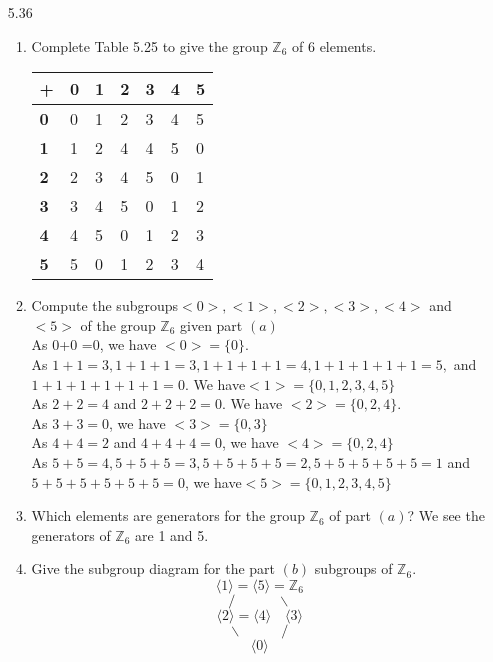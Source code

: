 \documentclass[12pt]{article}
\newcommand{\Z}{\mathds{Z}}
\begin{document}
\begin{enumerate}
		\item[5.36] \begin{enumerate}
			\item Complete Table 5.25 to give the group $\Z_6$ of 6 elements.
			\begin{table}[!h]
				\begin{tabular}{|l|l|l|l|l|l|l|}
					\hline
					+ & \textbf{0} & \textbf{1} & \textbf{2} & \textbf{3} & \textbf{4} & \textbf{5} \\ \hline
					\textbf{0} & 0 & 1 & 2 & 3 & 4 & 5 \\ \hline
					\textbf{1} & 1 & 2 & 4 & 4 & 5 & 0 \\ \hline
					\textbf{2} & 2 & 3 & 4 & 5 & 0 & 1 \\ \hline
					\textbf{3} & 3 & 4 & 5 & 0 & 1 & 2 \\ \hline
					\textbf{4} & 4 & 5 & 0 & 1 & 2 & 3 \\ \hline
					\textbf{5} & 5 & 0 & 1 & 2 & 3 & 4 \\ \hline
				\end{tabular}
			\end{table}
			\item Compute the subgroups$ <0>,<1>,<2>,<3>,<4>$ and $<5>$ of the group $\Z_6$ given part $(a)$\\
				As 0+0 =0, we have $<0> = \{0\}$.\\
				As $1+1=3,1+1+1=3,1+1+1+1=4,1+1+1+1+1=5,$ and $1+1+1+1+1+1=0$. We have$ <1> =  \{0,1,2,3,4,5\} $\\
				As $ 2+2=4 $ and $ 2+2+2=0 $. We have $<2> =  \{0,2,4\} $.\\
				As $ 3+3=0 $, we have $<3> = \{0,3\} $\\
				As $ 4+4=2 $ and $ 4+4+4=0 $, we have $<4> = \{0,2,4\} $\\
				As $ 5+5=4,5+5+5=3,5+5+5+5=2,5+5+5+5+5=1 $ and $ 5+5+5+5+5+5=0 $, we have$ <5> = \{0,1,2,3,4,5\} $
			\item Which elements are generators for the group $\Z_6$ of part $(a)$?
				We see the generators of $ \Z_6 $ are 1 and 5.
			\item Give the subgroup diagram for the part $(b)$ subgroups of $\Z_6$.
				\[\langle1\rangle=\langle5\rangle=\Z_6\]
				\[/ \qquad \quad \backslash \]
				\[\langle2\rangle=\langle4\rangle \quad \langle3\rangle\]
					\[\backslash \qquad \quad / \]
				\[\langle0\rangle\]	
		\end{enumerate}
			

\end{enumerate}
\end{document}

